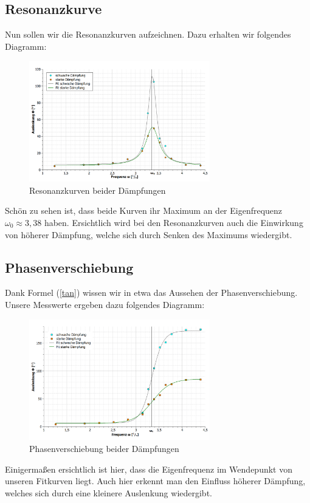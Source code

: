 \documentclass[fontsize=12pt]{scrartcl}
\begin{document}
\subsection{Resonanzkurve}

Nun sollen wir die Resonanzkurven aufzeichnen. Dazu erhalten wir folgendes Diagramm:
\begin{figure}[H]
\centering
\vspace{-10pt}
                \includegraphics[width=0.7\textwidth]{Graphik/Resonanz}
                \caption{Resonanzkurven beider Dämpfungen}
\end{figure}
\vspace{-10pt}
Schön zu sehen ist, dass beide Kurven ihr Maximum an der Eigenfrequenz $\omega_0\approx3,38$ haben. Ersichtlich wird bei den Resonanzkurven auch die Einwirkung von höherer Dämpfung, welche sich durch Senken des Maximums wiedergibt.
\newpage
\subsection{Phasenverschiebung}

Dank Formel (\ref{tan}) wissen wir in etwa das Aussehen der Phasenverschiebung. Unsere Messwerte ergeben dazu folgendes Diagramm:
\begin{figure}[H]
\centering
\vspace{-10pt}
                \includegraphics[width=0.7\textwidth]{Graphik/Phase}
                \caption{Phasenverschiebung beider Dämpfungen}
\end{figure}
\vspace{-10pt}
Einigermaßen ersichtlich ist hier, dass die Eigenfrequenz im Wendepunkt von unseren Fitkurven liegt. Auch hier erkennt man den Einfluss höherer Dämpfung, welches sich durch eine kleinere Auslenkung wiedergibt.
\end{document}
